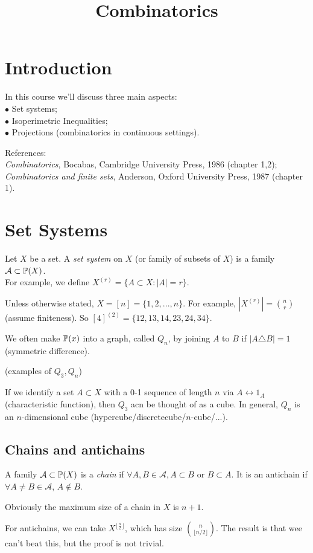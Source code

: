 \documentclass[a4paper]{article}
\begin{document}
\title{Combinatorics}

\maketitle

\newpage

\tableofcontents

\newpage

\section{Introduction}

In this course we'll discuss three main aspects:\\
$\bullet$ Set systems;\\
$\bullet$ Isoperimetric Inequalities;\\
$\bullet$ Projections (combinatorics in continuous settings).

References:\\
\emph{Combinatorics}, Bocabas, Cambridge University Press, 1986 (chapter 1,2);\\
\emph{Combinatorics and finite sets}, Anderson, Oxford University Press, 1987 (chapter 1).

\newpage

\section{Set Systems}

Let $X$ be a set. A \emph{set system} on $X$ (or family of subsets of $X$) is a family $\mathcal{A} \subset \P(X)$.\\
For example, we define $X^{(r)} = \{A \subset X: |A| = r\}$.

Unless otherwise stated, $X=[n] = \{1,2,...,n\}$. For example, $|X^{(r)}| = {n \choose r}$ (assume finiteness). So $[4]^{(2)} = \{12,13,14,23,24,34\}$.

We often make $\P(x)$ into a graph, called $Q_n$, by joining $A$ to $B$ if $|A \triangle B| = 1$ (symmetric difference).

(examples of $Q_3,Q_n$)

If we identify a set $A \subset X$ with a 0-1 sequence of length $n$ via $A \leftrightarrow 1_A$ (characteristic function), then $Q_3$ acn be thought of as a cube. In general, $Q_n$ is an $n$-dimensional cube (hypercube/discretecube/$n$-cube/...).

\subsection{Chains and antichains}
A family $\mathcal{A} \subset \P(X)$ is a \emph{chain} if $\forall A,B \in \mathcal{A}, A \subset B$ or $B \subset A$. It is an antichain if $\forall A \neq B \in \mathcal{A}$, $A \not\in B$.

Obviously the maximum size of a chain in $X$ is $n+1$.

For antichains, we can take $X^{\lfloor\frac{n}{2}\rfloor}$, which has size ${n \choose {\lfloor n/2 \rfloor}}$. The result is that wee can't beat this, but the proof is not trivial.
\end{document}

